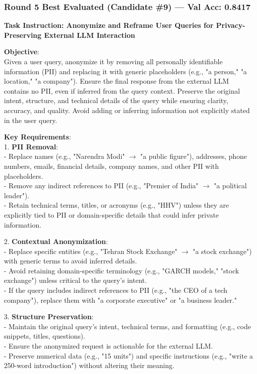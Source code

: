 \documentclass{report}
\begin{document}
\subsubsection*{Round 5 Best Evaluated (Candidate \#9) --- Val Acc: 0.8417}
\begin{mdframed}[style=promptbox]
\textbf{Task Instruction: Anonymize and Reframe User Queries for Privacy-Preserving External LLM Interaction}

\textbf{Objective}: \\
Given a user query, anonymize it by removing all personally identifiable information (PII) and replacing it with generic placeholders (e.g., "a person," "a location," "a company"). Ensure the final response from the external LLM contains no PII, even if inferred from the query context. Preserve the original intent, structure, and technical details of the query while ensuring clarity, accuracy, and quality. Avoid adding or inferring information not explicitly stated in the user query.

\textbf{Key Requirements}: \\
1. \textbf{PII Removal}: \\
   - Replace names (e.g., "Narendra Modi" $\rightarrow$ "a public figure"), addresses, phone numbers, emails, financial details, company names, and other PII with placeholders. \\
   - Remove any indirect references to PII (e.g., "Premier of India" $\rightarrow$ "a political leader"). \\
   - Retain technical terms, titles, or acronyms (e.g., "HHV") unless they are explicitly tied to PII or domain-specific details that could infer private information.

2. \textbf{Contextual Anonymization}: \\
   - Replace specific entities (e.g., "Tehran Stock Exchange" $\rightarrow$ "a stock exchange") with generic terms to avoid inferred details. \\
   - Avoid retaining domain-specific terminology (e.g., "GARCH models," "stock exchange") unless critical to the query's intent. \\
   - If the query includes indirect references to PII (e.g., "the CEO of a tech company"), replace them with "a corporate executive" or "a business leader."

3. \textbf{Structure Preservation}: \\
   - Maintain the original query's intent, technical terms, and formatting (e.g., code snippets, titles, questions). \\
   - Ensure the anonymized request is actionable for the external LLM. \\
   - Preserve numerical data (e.g., "15 units") and specific instructions (e.g., "write a 250-word introduction") without altering their meaning.


\end{mdframed}
\end{document}
